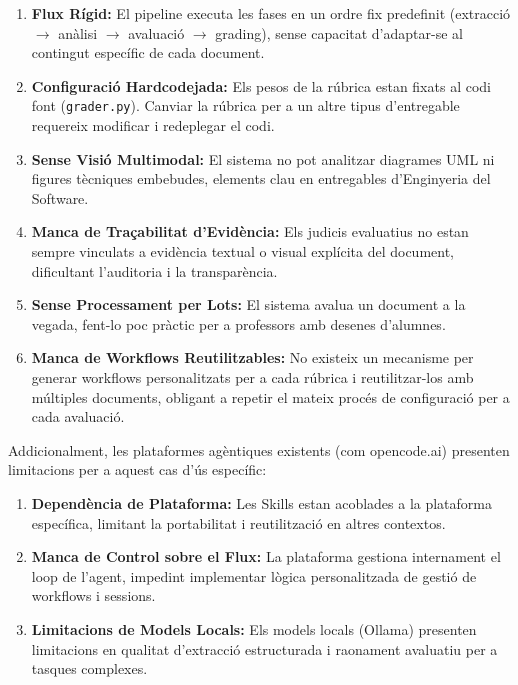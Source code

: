 \documentclass[12pt,a4paper,twoside]{report}
\begin{document}
\begin{enumerate}
    \item \textbf{Flux R\'igid:} El pipeline executa les fases en un ordre fix predefinit (extracci\'o $\rightarrow$ an\`alisi $\rightarrow$ avaluaci\'o $\rightarrow$ grading), sense capacitat d'adaptar-se al contingut espec\'ific de cada document.
    \item \textbf{Configuraci\'o Hardcodejada:} Els pesos de la r\'ubrica estan fixats al codi font (\texttt{grader.py}). Canviar la r\'ubrica per a un altre tipus d'entregable requereix modificar i redeplegar el codi.
    \item \textbf{Sense Visi\'o Multimodal:} El sistema no pot analitzar diagrames UML ni figures t\`ecniques embebudes, elements clau en entregables d'Enginyeria del Software.
    \item \textbf{Manca de Tra\c{c}abilitat d'Evid\`encia:} Els judicis evaluatius no estan sempre vinculats a evid\`encia textual o visual expl\'icita del document, dificultant l'auditoria i la transpar\`encia.
    \item \textbf{Sense Processament per Lots:} El sistema avalua un document a la vegada, fent-lo poc pr\`actic per a professors amb desenes d'alumnes.
    \item \textbf{Manca de Workflows Reutilitzables:} No existeix un mecanisme per generar workflows personalitzats per a cada r\'ubrica i reutilitzar-los amb m\'ultiples documents, obligant a repetir el mateix proc\'es de configuraci\'o per a cada avaluaci\'o.
\end{enumerate}

Addicionalment, les plataformes ag\`entiques existents (com opencode.ai) presenten limitacions per a aquest cas d'\'us espec\'ific:

\begin{enumerate}[start=7]
    \item \textbf{Depend\`encia de Plataforma:} Les Skills estan acoblades a la plataforma espec\'ifica, limitant la portabilitat i reutilitzaci\'o en altres contextos.
    \item \textbf{Manca de Control sobre el Flux:} La plataforma gestiona internament el loop de l'agent, impedint implementar l\`ogica personalitzada de gesti\'o de workflows i sessions.
    \item \textbf{Limitacions de Models Locals:} Els models locals (Ollama) presenten limitacions en qualitat d'extracci\'o estructurada i raonament avaluatiu per a tasques complexes.
\end{enumerate}
\end{document}
